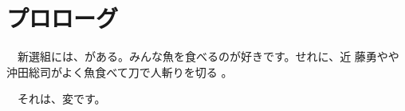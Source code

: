 \documentclass[12pt]{memoir}
\begin{document}
\chapter{プロローグ}

　新選組には、がある。みんな魚を食べるのが好きです。せれに、近
藤勇やや沖田総司がよく魚食べて刀で人斬りを切る
。


\par
　それは、変です。
\end{document}

